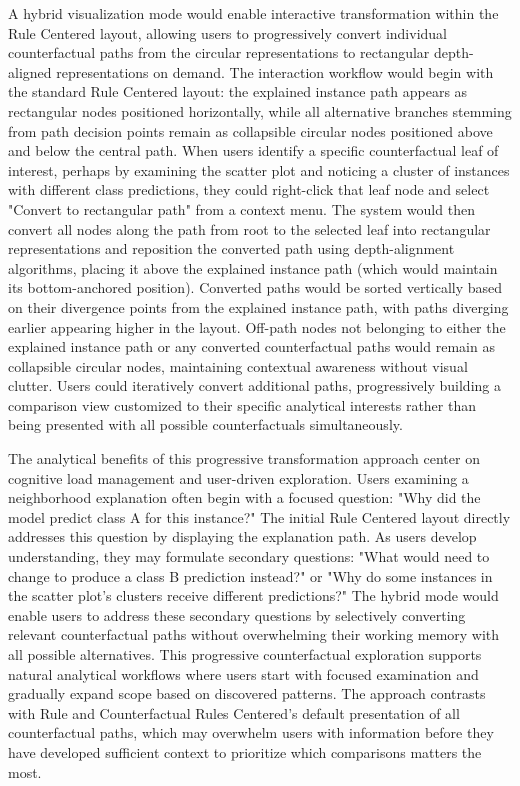 A hybrid visualization mode would enable interactive transformation within the Rule Centered layout, allowing users to progressively convert individual counterfactual paths from the circular representations to rectangular depth-aligned representations on demand. The interaction workflow would begin with the standard Rule Centered layout: the explained instance path appears as rectangular nodes positioned horizontally, while all alternative branches stemming from path decision points remain as collapsible circular nodes positioned above and below the central path. When users identify a specific counterfactual leaf of interest, perhaps by examining the scatter plot and noticing a cluster of instances with different class predictions, they could right-click that leaf node and select "Convert to rectangular path" from a context menu. The system would then convert all nodes along the path from root to the selected leaf into rectangular representations and reposition the converted path using depth-alignment algorithms, placing it above the explained instance path (which would maintain its bottom-anchored position). Converted paths would be sorted vertically based on their divergence points from the explained instance path, with paths diverging earlier appearing higher in the layout. Off-path nodes not belonging to either the explained instance path or any converted counterfactual paths would remain as collapsible circular nodes, maintaining contextual awareness without visual clutter. Users could iteratively convert additional paths, progressively building a comparison view customized to their specific analytical interests rather than being presented with all possible counterfactuals simultaneously.

The analytical benefits of this progressive transformation approach center on cognitive load management and user-driven exploration. Users examining a neighborhood explanation often begin with a focused question: "Why did the model predict class A for this instance?" The initial Rule Centered layout directly addresses this question by displaying the explanation path. As users develop understanding, they may formulate secondary questions: "What would need to change to produce a class B prediction instead?" or "Why do some instances in the scatter plot's clusters receive different predictions?" The hybrid mode would enable users to address these secondary questions by selectively converting relevant counterfactual paths without overwhelming their working memory with all possible alternatives. This progressive counterfactual exploration supports natural analytical workflows where users start with focused examination and gradually expand scope based on discovered patterns. The approach contrasts with Rule and Counterfactual Rules Centered's default presentation of all counterfactual paths, which may overwhelm users with information before they have developed sufficient context to prioritize which comparisons matters the most. 


